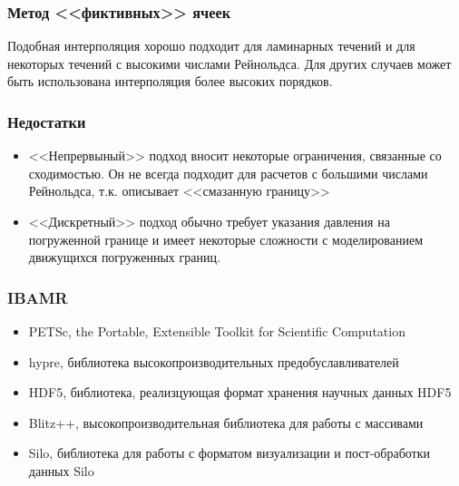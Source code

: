 \documentclass[14pt, notes]{beamer}
\begin{document}
\begin{frame}
\frametitle{Метод <<фиктивных>> ячеек}
Подобная интерполяция хорошо подходит для ламинарных течений и для некоторых течений с высокими числами Рейнольдса.
Для других случаев может быть использована интерполяция более высоких порядков. 
\end{frame}

\begin{frame}
\frametitle{Недостатки}
    \begin{itemize}
        \item \alert<+>{<<Непрервыный>> подход вносит некоторые ограничения, связанные со сходимостью. Он не всегда подходит для расчетов с большими числами Рейнольдса, т.к. описывает <<смазанную границу>>
}
        \item \alert<+>{<<Дискретный>> подход обычно требует указания давления на погруженной границе и имеет некоторые сложности с моделированием движущихся погруженных границ.}
    \end{itemize}
\end{frame}

\begin{frame}
\frametitle{IBAMR}
    \begin{itemize}
        \item \alert<+>{PETSc, the Portable, Extensible Toolkit for Scientific Computation}
        \item \alert<+>{hypre, библиотека высокопроизводительных предобуславливателей}
        \item \alert<+>{HDF5, библиотека, реализцующая формат хранения научных данных HDF5}
        \item \alert<+>{Blitz++, высокопроизводительная библиотека для работы с массивами}
        \item \alert<+>{Silo, библиотека для работы с форматом визуализации и пост-обработки данных Silo}
    \end{itemize}
\end{frame}
\end{document}
